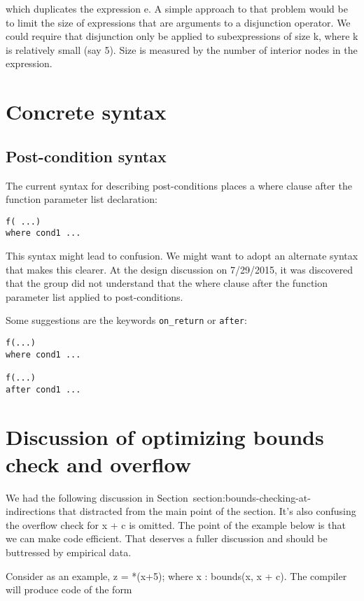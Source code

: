 which duplicates the expression e. A simple approach to that problem
would be to limit the size of expressions that are arguments to a
disjunction operator. We could require that disjunction only be applied
to subexpressions of size k, where k is relatively small (say 5). Size
is measured by the number of interior nodes in the expression.

 \section{Concrete syntax}

\subsection{Post-condition syntax}
The current syntax for describing post-conditions places a where clause
after the function parameter list declaration:

\begin{verbatim}
f( ...)
where cond1 ...
\end{verbatim}

This syntax might lead to confusion. We might want to adopt an alternate
syntax that makes this clearer. At the design discussion on 7/29/2015,
it was discovered that the group did not understand that the where
clause after the function parameter list applied to post-conditions.

Some suggestions are the keywords \texttt{on\_return} or \texttt{after}:

\begin{verbatim}
f(...)
where cond1 ...

f(...)
after cond1 ...
\end{verbatim}

\section{Discussion of optimizing bounds check and overflow}

We had the following discussion in Section~{section:bounds-checking-at-indirections}
that distracted from the
main point of the section. It's also confusing the overflow check for x
+ c is omitted. The point of the example below is that we can make code
efficient. That deserves a fuller discussion and should be buttressed by
empirical data.

Consider as an example, z = *(x+5); where x : bounds(x, x + c). The
compiler will produce code of the form

